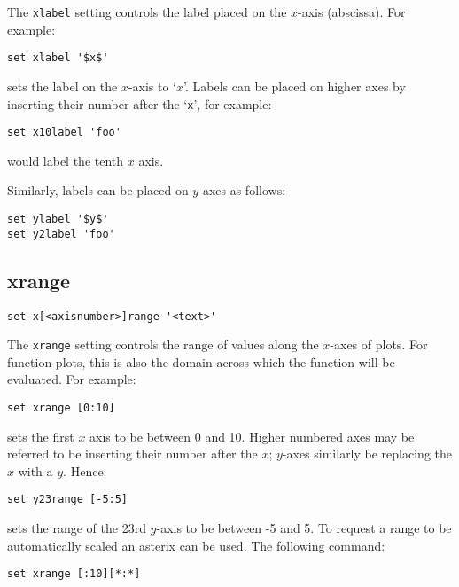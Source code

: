 The {\tt xlabel} setting controls the label placed on the $x$-axis (abscissa).
For example:

\begin{verbatim}
set xlabel '$x$'
\end{verbatim}

\noindent sets the label on the $x$-axis to `$x$'.  Labels can be placed on higher axes by
inserting their number after the `{\tt x}', for example:

\begin{verbatim}
set x10label 'foo'
\end{verbatim}

\noindent would label the tenth $x$ axis.

Similarly, labels can be placed on $y$-axes as follows:

\begin{verbatim}
set ylabel '$y$' 
set y2label 'foo'
\end{verbatim}


\subsection{xrange}

\begin{verbatim}
set x[<axisnumber>]range '<text>'
\end{verbatim}

The {\tt xrange} setting controls the range of values along the $x$-axes of
plots.  For function plots, this is also the domain across which the function
will be evaluated.  For example:

\begin{verbatim}
set xrange [0:10]
\end{verbatim}

\noindent sets the first $x$ axis to be between 0 and 10.  Higher numbered axes may be
referred to be inserting their number after the $x$; $y$-axes similarly be
replacing the $x$ with a $y$.  Hence:

\begin{verbatim}
set y23range [-5:5]
\end{verbatim}

\noindent sets the range of the 23rd $y$-axis to be between -5 and 5.  To
request a range to be automatically scaled an asterix can be used.  The
following command:

\begin{verbatim}
set xrange [:10][*:*]
\end{verbatim}

